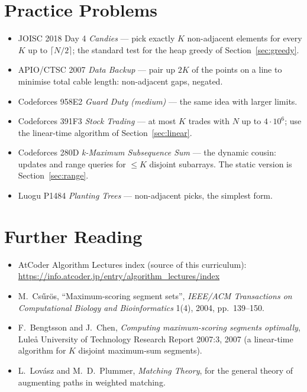 \documentclass[11pt]{article}
\begin{document}
\section{Practice Problems}
\begin{itemize}[leftmargin=1.5em,itemsep=1pt]
  \item JOISC 2018 Day 4 \emph{Candies} --- pick exactly $K$ non-adjacent
        elements for every $K$ up to $\lceil N/2\rceil$; the standard
        test for the heap greedy of Section~\ref{sec:greedy}.
  \item APIO/CTSC 2007 \emph{Data Backup} --- pair up $2K$ of the points on a
        line to minimise total cable length: non-adjacent gaps, negated.
  \item Codeforces 958E2 \emph{Guard Duty (medium)} --- the same idea with
        larger limits.
  \item Codeforces 391F3 \emph{Stock Trading} --- at most $K$ trades with
        $N$ up to $4\cdot10^6$; use the linear-time algorithm of
        Section~\ref{sec:linear}.
  \item Codeforces 280D \emph{k-Maximum Subsequence Sum} --- the dynamic
        cousin: updates and range queries for $\le K$ disjoint subarrays.
        The static version is Section~\ref{sec:range}.
  \item Luogu P1484 \emph{Planting Trees} --- non-adjacent picks, the
        simplest form.
\end{itemize}

\section{Further Reading}
\begin{itemize}[leftmargin=1.5em]
  \item AtCoder Algorithm Lectures index (source of this curriculum):
        \url{https://info.atcoder.jp/entry/algorithm_lectures/index}
  \item M.\ Cs\H{u}r\"os, ``Maximum-scoring segment sets'', \emph{IEEE/ACM
        Transactions on Computational Biology and Bioinformatics} 1(4),
        2004, pp.\ 139--150.
  \item F.\ Bengtsson and J.\ Chen, \emph{Computing maximum-scoring
        segments optimally}, Lule\aa{} University of Technology Research
        Report 2007:3, 2007 (a linear-time algorithm for $K$ disjoint
        maximum-sum segments).
  \item L.\ Lov\'asz and M.\ D.\ Plummer, \emph{Matching Theory}, for the
        general theory of augmenting paths in weighted matching.
\end{itemize}
\end{document}
